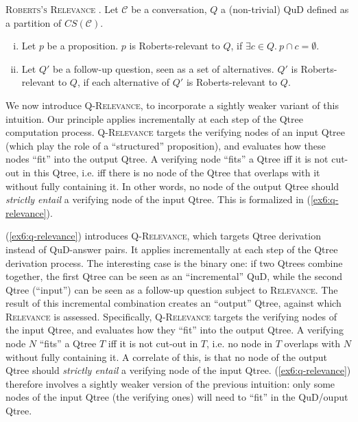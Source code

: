 \begin{exe}
	\ex\label{ex6:roberts-relevance} {\textsc{Roberts's Relevance \citep{Roberts2012}.} Let $\mathcal{C}$ be a conversation, $Q$ a (non-trivial) QuD defined as a partition of $CS(\mathcal{C})$. 
		\begin{enumerate}[(i)]
			\item\label{ex6:roberts-relevance-p} Let $p$ be a proposition. $p$ is Roberts-relevant to $Q$, if $\exists c \in Q. \ p \cap c = \emptyset$.
			\item\label{ex6:roberts-relevance-q} Let $Q'$ be a follow-up question, seen as a set of alternatives. $Q'$ is Roberts-relevant to $Q$, if each alternative of $Q'$ is Roberts-relevant to $Q$.
		\end{enumerate}
	}
\end{exe}






We now introduce \textsc{Q-Relevance}, to incorporate a sightly weaker variant of this intuition. Our principle applies incrementally at each step of the Qtree computation process. \textsc{Q-Relevance} targets the verifying nodes of an input Qtree (which play the role of a ``structured'' proposition), and evaluates how these nodes ``fit'' into the output Qtree. A verifying node ``fits'' a Qtree iff it is not cut-out in this Qtree, i.e. iff there is no node of the Qtree that overlaps with it without fully containing it. In other words, no node of the output Qtree should \textit{strictly entail} a verifying node of the input Qtree. This is formalized in (\ref{ex6:q-relevance}).

(\ref{ex6:q-relevance}) introduces \textsc{Q-Relevance}, which targets Qtree derivation instead of QuD-answer pairs. It applies incrementally at each step of the Qtree derivation process. The interesting case is the binary one: if two Qtrees combine together, the first Qtree can be seen as an ``incremental'' QuD, while the second Qtree (``input'') can be seen as a follow-up question subject to \textsc{Relevance}. The result of this incremental combination creates an ``output'' Qtree, against which \textsc{Relevance} is assessed. Specifically, \textsc{Q-Relevance} targets the verifying nodes of the input Qtree, and evaluates how they ``fit'' into the output Qtree. A verifying node $N$ ``fits'' a Qtree $T$ iff it is not cut-out in $T$, i.e. no node in $T$ overlaps with $N$ without fully containing it. A correlate of this, is that no node of the output Qtree should \textit{strictly entail} a verifying node of the input Qtree. (\ref{ex6:q-relevance}) therefore involves a sightly weaker version of the previous intuition: only some nodes of the input Qtree (the verifying ones) will need to ``fit'' in the QuD/ouput Qtree.

